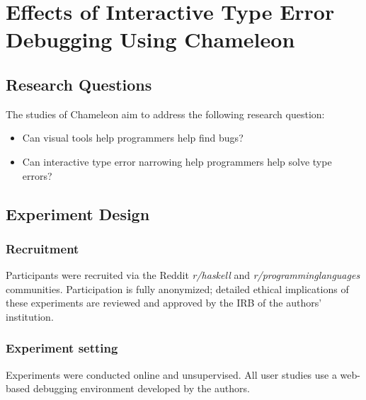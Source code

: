
\chapter{Effects of Interactive Type Error Debugging Using Chameleon}
\label{chap:chameleon:eval} 

\section{Research Questions}

The studies of Chameleon aim to address the following research question:

\begin{itemize}
	\item Can visual tools help programmers help find bugs?
	\item Can interactive type error narrowing help programmers help solve type errors?
\end{itemize}

\section{Experiment Design}

\subsection{\textbf{Recruitment}}

Participants were recruited via the Reddit \textit{r/haskell} and \textit{r/programminglanguages} communities. 
Participation is fully anonymized; detailed ethical implications of these experiments are reviewed and approved by the IRB of the authors' institution.

\subsection{\textbf{Experiment setting}}
Experiments were conducted online and unsupervised. 
All user studies use a web-based debugging environment developed by the authors. 


